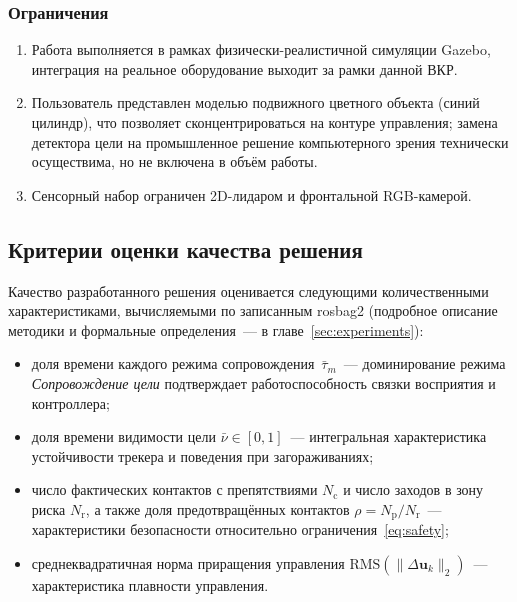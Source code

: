 \subsubsection{Ограничения}

\begin{enumerate}
    \item Работа выполняется в рамках физически-реалистичной симуляции
          Gazebo, интеграция на реальное оборудование выходит за рамки
          данной ВКР.
    \item Пользователь представлен моделью подвижного цветного объекта
          (синий цилиндр), что позволяет сконцентрироваться на контуре
          управления; замена детектора цели на промышленное решение
          компьютерного зрения технически осуществима, но не включена в
          объём работы.
    \item Сенсорный набор ограничен 2D-лидаром и фронтальной
          RGB-камерой.
\end{enumerate}

\subsection{Критерии оценки качества решения}

Качество разработанного решения оценивается следующими
количественными характеристиками, вычисляемыми по записанным
rosbag2 (подробное описание методики и формальные определения~---
в главе~\ref{sec:experiments}):
\begin{itemize}
    \item доля времени каждого режима сопровождения~$\bar{\tau}_m$~---
          доминирование режима \textit{Сопровождение цели}
          подтверждает работоспособность связки восприятия и
          контроллера;
    \item доля времени видимости цели $\bar{\nu} \in [0,1]$~---
          интегральная характеристика устойчивости трекера и
          поведения при загораживаниях;
    \item число фактических контактов с препятствиями
          $N_{\text{c}}$ и число заходов в зону риска
          $N_{\text{r}}$, а также доля предотвращённых контактов
          $\rho = N_{\text{p}}/N_{\text{r}}$~--- характеристики
          безопасности относительно ограничения~\eqref{eq:safety};
    \item среднеквадратичная норма приращения управления
          $\mathrm{RMS}(\|\Delta\mathbf{u}_k\|_2)$~--- характеристика
          плавности управления.
\end{itemize}
